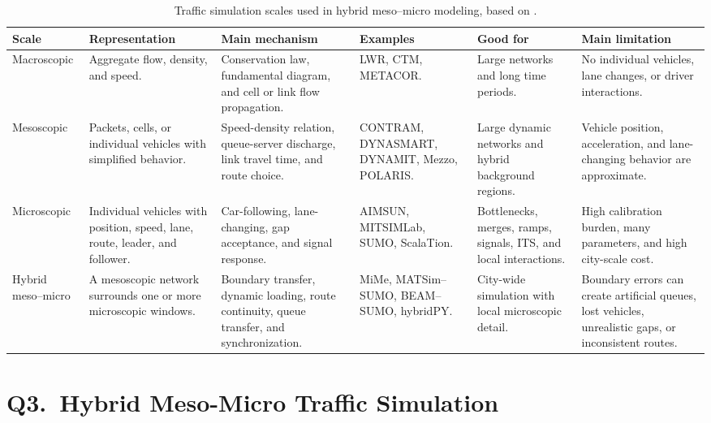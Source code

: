 \begin{bibunit}[plainnat]
\begin{table}[h]
\centering
\renewcommand{\arraystretch}{1.25}
\begin{tabularx}{\textwidth}{>{\raggedright\arraybackslash}p{1.55cm} >{\raggedright\arraybackslash}X >{\raggedright\arraybackslash}X >{\raggedright\arraybackslash}X >{\raggedright\arraybackslash}X >{\raggedright\arraybackslash}X}
\toprule
\textbf{Scale} & \textbf{Representation} & \textbf{Main mechanism} & \textbf{Examples} & \textbf{Good for} & \textbf{Main limitation} \\
\midrule
Macroscopic
&
Aggregate flow, density, and speed.
&
Conservation law, fundamental diagram, and cell or link flow propagation.
&
LWR, CTM, METACOR.
&
Large networks and long time periods.
&
No individual vehicles, lane changes, or driver interactions.
\\
\addlinespace
Mesoscopic
&
Packets, cells, or individual vehicles with simplified behavior.
&
Speed-density relation, queue-server discharge, link travel time, and route choice.
&
CONTRAM, DYNASMART, DYNAMIT, Mezzo, POLARIS.
&
Large dynamic networks and hybrid background regions.
&
Vehicle position, acceleration, and lane-changing behavior are approximate.
\\
\addlinespace
Microscopic
&
Individual vehicles with position, speed, lane, route, leader, and follower.
&
Car-following, lane-changing, gap acceptance, and signal response.
&
AIMSUN, MITSIMLab, SUMO, ScalaTion.
&
Bottlenecks, merges, ramps, signals, ITS, and local interactions.
&
High calibration burden, many parameters, and high city-scale cost.
\\
\addlinespace
Hybrid meso--micro
&
A mesoscopic network surrounds one or more microscopic windows.
&
Boundary transfer, dynamic loading, route continuity, queue transfer, and synchronization.
&
MiMe, MATSim--SUMO, BEAM--SUMO, hybridPY.
&
City-wide simulation with local microscopic detail.
&
Boundary errors can create artificial queues, lost vehicles, unrealistic gaps, or inconsistent routes.
\\
\bottomrule
\end{tabularx}
\caption{Traffic simulation scales used in hybrid meso--micro modeling, based on \citet{burghout2004thesis}.}
\label{tab:q3-model-scales}
\end{table}


\section{Q3.\ Hybrid Meso-Micro Traffic Simulation}


\end{bibunit}
